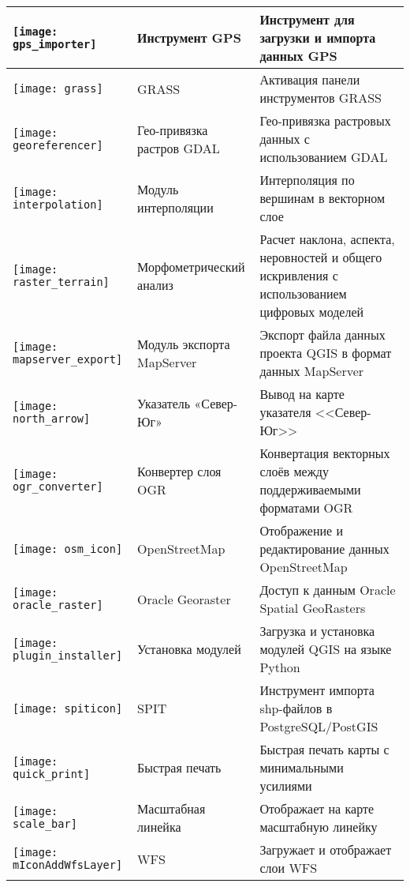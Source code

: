 {\begin{longtable}{|p{1.2cm}|p{3.8cm}|p{10.5cm}|}
\hline
\texttt{[image: gps\_importer]}
 & Инструмент GPS \index{модули!GPS}& Инструмент для загрузки и импорта данных GPS\\
\hline
\texttt{[image: grass]}
 & GRASS \index{модули!инструменты GRASS} & Активация панели инструментов GRASS\\
\hline
\texttt{[image: georeferencer]}
 & Гео-привязка растров GDAL \index{модули!привязка} & Гео-привязка растровых данных с использованием GDAL\\
\hline
\texttt{[image: interpolation]}
& Модуль интерполяции \index{модули!интерполяция}& Интерполяция по вершинам в векторном слое\\
\hline
\texttt{[image: raster\_terrain]}
& Морфометрический анализ \index{модули!морфометрический анализ}& Расчет наклона, аспекта,
неровностей и общего искривления с использованием цифровых моделей\\
\hline
\texttt{[image: mapserver\_export]}
& Модуль экспорта MapServer \index{модули!экспорт в MapServer}& Экспорт файла данных проекта QGIS в формат данных MapServer \\
\hline
\texttt{[image: north\_arrow]}
& Указатель «Север-Юг» \index{модули!стрелка севера}& Вывод на карте указателя <<Север-Юг>>\\
\hline
\texttt{[image: ogr\_converter]}
 & Конвертер слоя OGR \index{модули!преобразователь OGR} & Конвертация векторных слоёв между поддерживаемыми форматами  OGR\\
\hline
\texttt{[image: osm\_icon]}
 & OpenStreetMap & Отображение и редактирование данных  OpenStreetMap\\
\hline
\texttt{[image: oracle\_raster]}
 & Oracle Georaster \index{модули!georaster}& Доступ к данным  Oracle Spatial GeoRasters\\
\hline
\texttt{[image: plugin\_installer]}
 & Установка модулей \index{модули!Plugin Installer} & Загрузка и установка модулей QGIS на языке Python\\
\hline
\texttt{[image: spiticon]}
 & SPIT \index{модули!SPIT}& Инструмент импорта shp-файлов в  PostgreSQL/PostGIS\\
\hline
\texttt{[image: quick\_print]}
 & Быстрая печать \index{модули!быстрая печать}& Быстрая печать карты с минимальными усилиями\\
\hline
\texttt{[image: scale\_bar]}
 & Масштабная линейка \index{модули!масштабная линейка}& Отображает на карте масштабную линейку\\
\hline
\texttt{[image: mIconAddWfsLayer]}
 & WFS & Загружает и отображает слои WFS\\
\hline
\end{longtable}}

